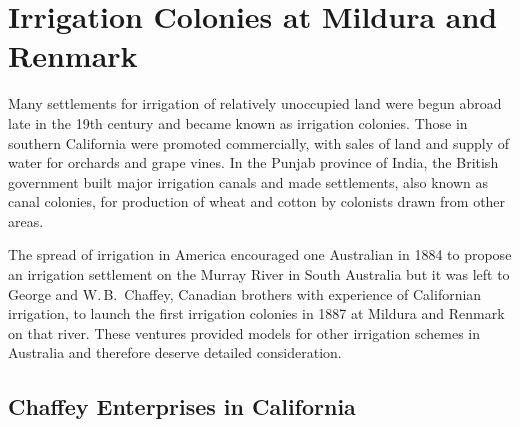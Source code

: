 
\chapter{Irrigation Colonies at Mildura and Renmark}

\label{ch:colonies}

\setcounter{endnote}{0}

Many settlements for irrigation of relatively unoccupied land were
begun abroad late in the 19th century and became known as irrigation
colonies.  Those in southern California were
promoted commercially, with sales of land and supply of water for
orchards and grape vines.  In the Punjab province of India,
 the British government built major irrigation canals and
made settlements, also known as canal colonies, for production of
wheat and cotton by colonists drawn from other
areas.

The spread of irrigation in America encouraged one
Australian in 1884 to propose an irrigation settlement on the Murray
River in South Australia but it was left to George and W.\,B.~Chaffey,
 Canadian  brothers with
experience of Californian irrigation, to launch the first irrigation
colonies in 1887 at Mildura and Renmark on that river.  These ventures
provided models for other irrigation schemes in Australia and
therefore deserve detailed consideration.

\section*{Chaffey Enterprises in California}

